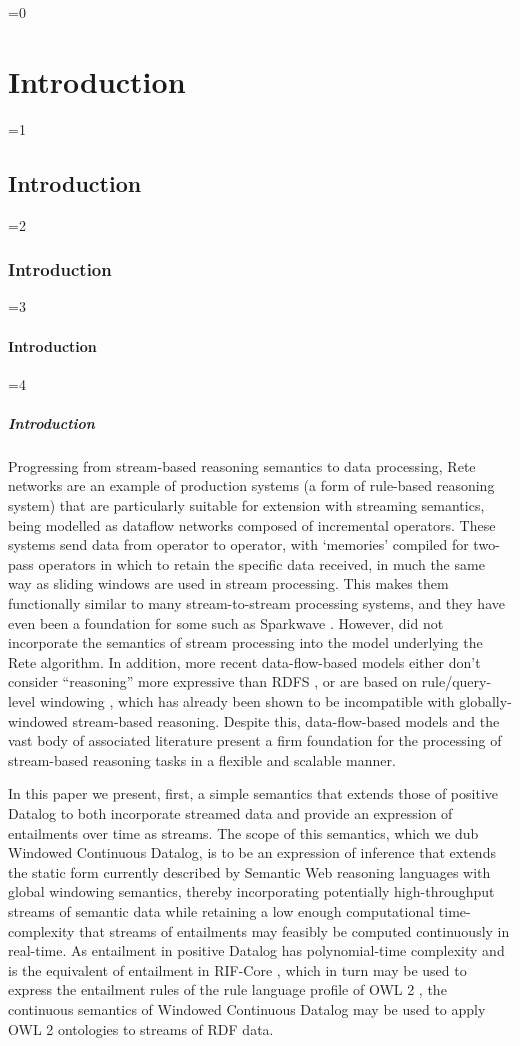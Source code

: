 \documentclass[twocolumn,preprint,3p,number]{elsarticle}
\theoremstyle{plain}
\theoremstyle{definition}
\newcounter{nestingdepth}
\newenvironment{nestedsection}[2]{
  \ifnum\value{nestingdepth}=0
    \chapter{#1}
  \else
    \ifnum\value{nestingdepth}=1
      \section{#1}
    \else
      \ifnum\value{nestingdepth}=2
        \subsection{#1}
      \else
        \ifnum\value{nestingdepth}=3
          \subsubsection{#1}
        \else
          \ifnum\value{nestingdepth}=4
            \paragraph{#1}
          \else
            \PackageError{nestedsections}{Maximum nesting level exceeded!}{uh oh!}
          \fi
        \fi
      \fi
    \fi
  \fi
  \addtocounter{nestingdepth}{1}
  \label{sec:#2}
}{\addtocounter{nestingdepth}{-1}}
\begin{document}
\begin{nestedsection}{Introduction}{intro}
  Progressing from stream-based reasoning semantics to data processing, Rete networks \citep{forgy79} are an example of production systems (a form of rule-based reasoning system) that are particularly suitable for extension with streaming semantics, being modelled as dataflow networks composed of incremental operators.
  These systems send data from operator to operator, with `memories' compiled for two-pass operators in which to retain the specific data received, in much the same way as sliding windows are used in stream processing.
  This makes them functionally similar to many stream-to-stream processing systems, and they have even been a foundation for some such as Sparkwave \citep{sparkwave}.
  However, \citet{forgy79} did not incorporate the semantics of stream processing into the model underlying the Rete algorithm.
  In addition, more recent data-flow-based models either don't consider ``reasoning'' more expressive than RDFS \citep{sparkwave}, or are based on rule/query-level windowing \citep{C-SPARQL,walavalkar08streamingkb}, which has already been shown to be incompatible with globally-windowed stream-based reasoning.
  Despite this, data-flow-based models and the vast body of associated literature present a firm foundation for the processing of stream-based reasoning tasks in a flexible and scalable manner.

  In this paper we present, first, a simple semantics that extends those of positive Datalog to both incorporate streamed data and provide an expression of entailments over time as streams.
  The scope of this semantics, which we dub Windowed Continuous Datalog, is to be an expression of inference that extends the static form currently described by Semantic Web reasoning languages with global windowing semantics, thereby incorporating potentially high-throughput streams of semantic data while retaining a low enough computational time-complexity that streams of entailments may feasibly be computed continuously in real-time.
  As entailment in positive Datalog has polynomial-time complexity and is the equivalent of entailment in RIF-Core \citep{w3crifcore}, which in turn may be used to express the entailment rules of the rule language profile of OWL 2 \citep{w3cowl2profiles}, the continuous semantics of Windowed Continuous Datalog may be used to apply OWL 2 ontologies to streams of RDF data.


\end{nestedsection}
\end{document}
